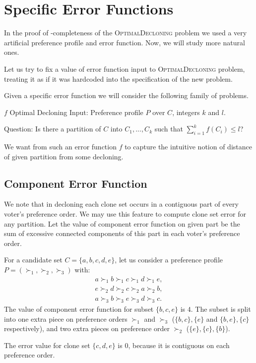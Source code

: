 \section{Specific Error Functions}

In the proof of \np-completeness of the \textsc{OptimalDecloning} problem
we used a very artificial preference profile and error function.
Now, we will study more natural ones.

Let us try to fix a value of error function input to \textsc{OptimalDecloning} problem,
treating it as if it was hardcoded into the specification of the new problem.

Given a specific error function we will consider the following family of problems.

\begin{problem}{ $f$ Optimal Decloning}
	Input: Preference profile $P$ over $C$, integers $k$ and $l$.

	Question: Is there a partition of $C$ into $C_1, ..., C_k$ such that $\sum_{i=1}^k f(C_i) \leq l$?
\end{problem}

We want from such an error function $f$ to capture the intuitive notion
of distance of given partition from some decloning.

\subsection{Component Error Function}

We note that in decloning each clone set occurs in a contiguous part of every voter's preference order.
We may use this feature to compute clone set error for any partition.
Let the value of component error function on given part be the sum of excessive connected components
of this part in each voter's preference order.

\begin{exmp}
For a candidate set $C = \{a, b, c, d, e\}$,
let us consider a preference profile $P = (\succ_1, \succ_2, \succ_3)$ with:
\begin{align*}
a \succ_1 b \succ_1 c \succ_1 d \succ_1 e,\\
e \succ_2 d \succ_2 c \succ_2 a \succ_2 b,\\
a \succ_3 b \succ_3 e \succ_3 d \succ_3 c.
\end{align*}
The value of component error function for subset $\{b,c,e\}$ is $4$.
The subset is split into one extra piece on preference orders $\succ_1$ and $\succ_3$
($\{b,c\}, \{e\}$ and $\{b,e\}, \{c\}$ respectively),
and two extra pieces on preference order $\succ_2$ ($\{e\}, \{c\}, \{b\}$).

The error value for clone set $\{c, d, e\}$ is $0$,
because it is contiguous on each preference order.
\end{exmp}

